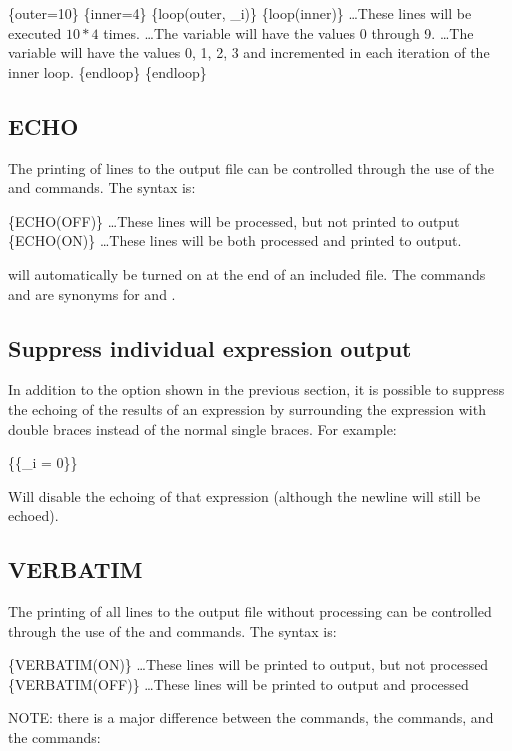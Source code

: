 \begin{apinp}
\{outer=10\} \{inner=4\}
\{loop(outer, \_i)\}
\{loop(inner)\}
\ldots These lines will be executed $10 * 4$ times.
\ldots The variable  will have the values 0 through 9. 
\ldots The variable  will have the values 0, 1, 2, 3 and incremented in each iteration of the inner loop.
\{endloop\}
\{endloop\}
\end{apinp}

\subsection{ECHO}\label{echo} The printing of lines to the output file can be controlled
through the use of the  and 
commands. The syntax is:

\begin{apinp}
\{ECHO(OFF)\}
\ldots These lines will be processed, but not printed to output
\{ECHO(ON)\}
\ldots These lines will be both processed and printed to output.
\end{apinp}

 will automatically be turned on at the end of an included file. The
commands  and  are synonyms for  and .

\subsection{Suppress individual expression output}
In addition to the  option shown in the previous section, it
is possible to suppress the echoing of the results of an expression by
surrounding the expression with double braces instead of the normal
single braces.  For example:
\begin{apinp}
\{\{\_i = 0\}\}
\end{apinp}
Will disable the echoing of that expression (although the newline will
still be echoed). 

\subsection{VERBATIM} The printing of all lines to the output file without processing
can be controlled through the use of the  and 
commands. The syntax is:

\begin{apinp}
\{VERBATIM(ON)\}
\ldots These lines will be printed to output, but not processed
\{VERBATIM(OFF)\}
\ldots These lines will be printed to output and processed
\end{apinp}
NOTE:  there  is  a  major  difference  between  the   commands,
the commands, and the  commands:

